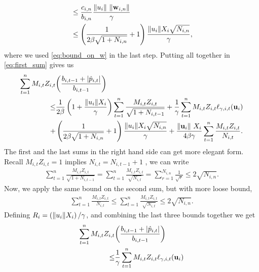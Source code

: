 {\begin{equation*}
\begin{split}
&\le\frac{c_{i,n}}{b_{i,n}}\frac{{\Vert u_i\Vert}~{\Vert\mathbf{w}_{i,n}\Vert}}{\gamma}\\
&\le\left({\frac{1}{2\beta\sqrt{1+N_{i,n}}}+1}\right)\frac{{\Vert u_i\Vert}X_i\sqrt{N_{i,n}}}{\gamma},
\end{split}
\end{equation*}
where we used \eqref{eq:bound_on_w} in the last step.
Putting all together in \eqref{eq:first_sum}  gives us
\begin{equation*}
\begin{split}
\sum_{t=1}^{n}M_{i,t}Z_{i,t}&{\left({\frac{b_{i,t-1} +\left\vert{\hat{p}_{i,t}}\right\vert}{b_{i,t-1}}}\right)}\\
\le &\frac{1}{2\beta}\left({1+\frac{\Vert u_i\Vert X_i}{\gamma}}\right)\sum_{t=1}^{n}{\frac{M_{i,t}Z_{i,t}}{\sqrt{1+N_{i,t-1}}}}
+\frac{1}{\gamma}\sum_{t=1}^{n}{M_{i,t}Z_{i,t}}\ell_{\gamma,i,t}(\mathbf{u}_i)\\
+&\left({\frac{1}{2\beta\sqrt{1+N_{i,n}}}+1}\right)\frac{{\Vert u_i\Vert}X_i\sqrt{N_{i,n}}}{\gamma}
+\frac{\Vert\mathbf{u}_i\Vert~ X_i}{4\beta\gamma}\sum_{t=1}^{n}{\frac{M_{i,t}Z_{i,t}}{N_{i,t}}}.
\end{split}
\end{equation*} 
The first and the last sums in the right hand side can get more elegant form. Recall $M_{i,t}Z_{i,t}=1$ implies $N_{i,t}=N_{i,t-1}+1$ , we can write  
\begin{equation*}
\begin{split}
\sum_{t=1}^{n}{\frac{M_{i,t}Z_{i,t}}{\sqrt{1+N_{i,t-1}}}}
=\sum_{t=1}^{n}{\frac{M_{i,t}Z_{i,t}}{\sqrt{N_{i,t}}}}
=\sum_{r=1}^{N_{i,n}}{\frac{1}{\sqrt{r}}} 
\le 2\sqrt{N_{i,n}}.
\end{split}
\end{equation*}
Now, we apply the same bound on the second sum, but with more loose bound, \begin{equation*}
\begin{split}
\sum_{t=1}^{n}{\frac{M_{i,t}Z_{i,t}}{N_{i,t}}}
\le\sum_{t=1}^{n}{\frac{M_{i,t}Z_{i,t}}{\sqrt{N_{i,t}}}} 
\le 2\sqrt{N_{i,n}}. 
\end{split}
\end{equation*}
Defining $R_i=\left({\Vert u_i\Vert X_i}\right)/{\gamma}$, and combining the last three bounds together we get
\begin{equation*}
\begin{split}
\sum_{t=1}^{n}M_{i,t}Z_{i,t}&{\paren{\frac{b_{i,t-1} +\abs{\hat{p}_{i,t}}}{b_{i,t-1}}}}\\
\le &\frac{1}{\gamma}\sum_{t=1}^{n}{M_{i,t}Z_{i,t}}\lossp{\gamma,i,t}(\vu_i)

\end{split}
\end{equation*}}

